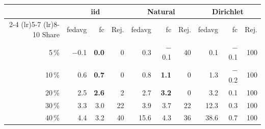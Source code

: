 \begin{tabular}{rrrrrrrrrr}
\toprule
 & \multicolumn{3}{c}{\gls{iid}} & \multicolumn{3}{c}{Natural} & \multicolumn{3}{c}{Dirichlet} \\
\cmidrule(lr){2-4} \cmidrule(lr){5-7} \cmidrule(lr){8-10}
Share & \gls{fedavg} & \gls{fc} & Rej. & \gls{fedavg} & \gls{fc} & Rej. & \gls{fedavg} & \gls{fc} & Rej. \\
\midrule
5\,\% & $-$0.1 & \textbf{0.0} & 0 & 0.3 & $-$0.1 & 40 & 0.1 & $-$0.1 & 100 \\
10\,\% & 0.6 & \textbf{0.7} & 0 & 0.8 & \textbf{1.1} & 0 & 1.3 & $-$0.2 & 100 \\
20\,\% & 2.5 & \textbf{2.6} & 2 & 2.7 & \textbf{3.2} & 0 & 3.2 & 0.1 & 100 \\
30\,\% & 3.3 & 3.0 & 22 & 3.9 & 3.7 & 22 & 12.3 & 0.3 & 100 \\
40\,\% & 4.4 & 3.2 & 40 & 15.6 & 4.3 & 36 & 38.6 & 0.7 & 100 \\
\bottomrule
\end{tabular}

